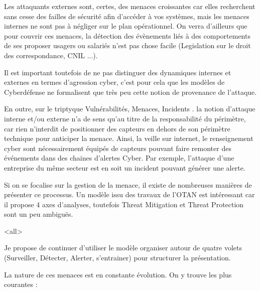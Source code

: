 Les attaquants externes sont, certes, des menaces croissantes car elles recherchent sans cesse des failles de sécurité afin d’accéder à vos systèmes, mais les menaces internes ne sont  pas à négliger sur le plan opérationnel. On verra d'ailleurs que pour couvrir ces menaces, la détection des évènements liés à des comportements de ses proposer usagers ou salariés n'est pas chose facile (Legislation sur le droit des correspondance, CNIL ...).

Il est important toutefois de ne pas distinguer des dynamiques internes et externes en termes d'agression cyber, c'est pour cela que les modèles de Cyberdéfense ne formalisent que très peu cette notion de provenance de l'attaque.

En outre, sur le triptyque Vulnérabilités, Menaces, Incidents . la notion d'attaque interne et/ou externe n'a de sens qu'au titre de la responsabilité du périmètre, car rien n'interdit de positionner des capteurs en dehors de son périmètre technique pour anticiper la menace. Ainsi, la veille sur internet, le renseignement cyber sont nécessairement équipés de capteurs pouvant faire remonter des événements dans des chaines d'alertes Cyber.
Par exemple, l'attaque d'une entreprise du même secteur est en soit un incident pouvant générer une alerte.

Si on se focalise sur la gestion de la menace, il existe de nombreuses manières de présenter ce processus. Un modèle  issu des travaux de l'OTAN est intéressant car il propose 4 axes d'analyses, toutefois Threat Mitigation et Threat Protection sont un peu ambiguës.


\mode<all>{}

Je propose de continuer d'utiliser le modèle organiser autour de quatre volets (Surveiller, Détecter, Alerter, s'entrainer)   pour structurer la présentation.


La nature de ces menaces est en constante évolution.  On y trouve les plus courantes :


